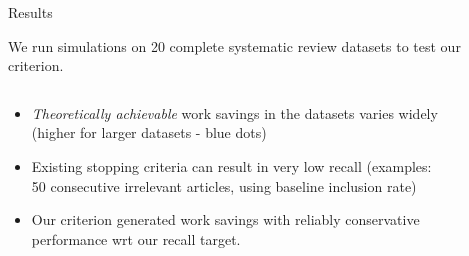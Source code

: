 \documentclass[9pt,aspectratio=169]{beamer}
\begin{document}
\begin{frame}{Results}

We run simulations on 20 complete systematic review datasets to test our criterion.

\begin{columns}
	\begin{column}{0.618\linewidth}
		\begin{itemize}
			\item<1-> \textit{Theoretically achievable} work savings in the datasets varies widely (higher for larger datasets - blue dots)
			\item<2-> Existing stopping criteria can result in very low recall (examples: 50 consecutive irrelevant articles, using baseline inclusion rate)
			\item<4-> Our criterion generated work savings with reliably conservative performance wrt our recall target.
		\end{itemize}
	\end{column}
	\begin{column}{0.382\linewidth}
		\begin{figure}

\end{figure}
\end{column}
\end{columns}
\end{frame}
\end{document}
